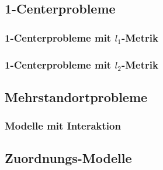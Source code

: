 
      \subsection{1-Centerprobleme} %
      \label{sub:1_centerprobleme}

        \subsubsection{1-Centerprobleme mit $l_1$-Metrik} %
        \label{ssub:1_centerprobleme_mit_l_1_metrik}
        

        \subsubsection{1-Centerprobleme mit $l_2$-Metrik} %
        \label{ssub:1_centerprobleme_mit_l_2_metrik}
        

      

      \subsection{Mehrstandortprobleme} %
      \label{sub:mehrstandortprobleme}
      
        \subsubsection{Modelle mit Interaktion} %
        \label{ssub:modelle_mit_interaktion}
        

        \subsection{Zuordnungs-Modelle} %
        \label{sub:zuordnungs_modelle}
        


